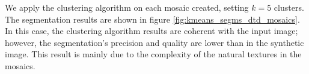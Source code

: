 \documentclass[journal]{IEEEtran}
\begin{document}
We apply the clustering algorithm on each mosaic created, setting $ k = 5 $ clusters. The segmentation results are shown in figure \ref{fig:kmeans_segms_dtd_mosaics}. In this case, the clustering algorithm results are coherent with the input image; however, the segmentation's precision and quality are lower than in the synthetic image. This result is mainly due to the complexity of the natural textures in the mosaics. 

%    
%        	    
\end{document}
